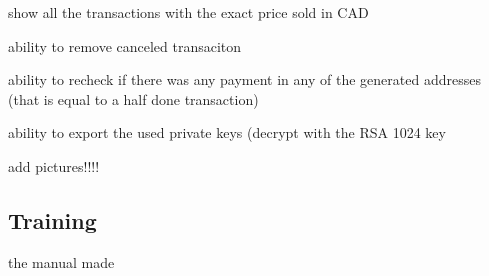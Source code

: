 show all the transactions with the exact price sold in CAD

ability to remove canceled transaciton

ability to recheck if there was any payment in any of the generated addresses (that is equal to a half done transaction)

ability to export the used private keys (decrypt with the RSA 1024 key

add pictures!!!!


\subsection{Training}

the manual made















